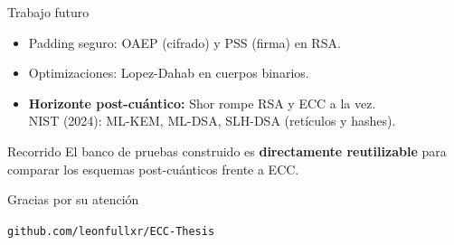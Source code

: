 \documentclass[aspectratio=169,11pt]{beamer}
\begin{document}
\begin{frame}{Trabajo futuro}
  \begin{itemize}
    \item Padding seguro: \alert{OAEP} (cifrado) y \alert{PSS} (firma) en RSA.
    \item Optimizaciones: \alert{Lopez-Dahab} en cuerpos binarios. 
    \item \textbf{Horizonte post-cuántico:} Shor rompe \alert{RSA y ECC a la vez}.
          \\ NIST (2024): ML-KEM, ML-DSA, SLH-DSA (retículos y hashes).
  \end{itemize}
  \vfill
  \begin{alertblock}{Recorrido}
    El banco de pruebas construido es \textbf{directamente reutilizable} para comparar los
    esquemas post-cuánticos frente a ECC.
  \end{alertblock}
\end{frame}

\begin{frame}[standout]
  Gracias por su atención
  \vspace{1em}

  {\normalsize \texttt{github.com/leonfullxr/ECC-Thesis}}
\end{frame}

\appendix
\end{document}
